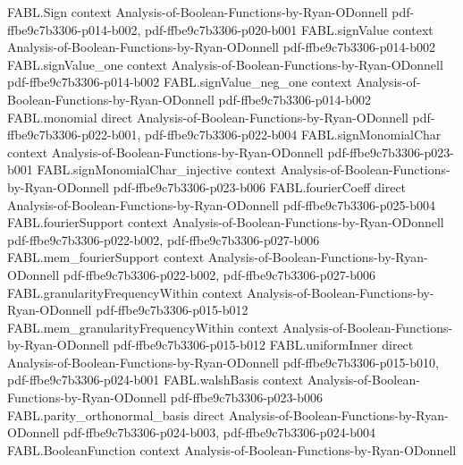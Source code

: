 \begin{theorem}
\label{FABL.parityFunction_toReal}
\leanok
{}
\proofstep
  {FABL.Sign}
  {context}
  {Analysis-of-Boolean-Functions-by-Ryan-ODonnell}
  {pdf-ffbe9c7b3306-p014-b002,
    pdf-ffbe9c7b3306-p020-b001}
\proofstep
  {FABL.signValue}
  {context}
  {Analysis-of-Boolean-Functions-by-Ryan-ODonnell}
  {pdf-ffbe9c7b3306-p014-b002}
\proofstep
  {FABL.signValue_one}
  {context}
  {Analysis-of-Boolean-Functions-by-Ryan-ODonnell}
  {pdf-ffbe9c7b3306-p014-b002}
\proofstep
  {FABL.signValue_neg_one}
  {context}
  {Analysis-of-Boolean-Functions-by-Ryan-ODonnell}
  {pdf-ffbe9c7b3306-p014-b002}
\proofstep
  {FABL.monomial}
  {direct}
  {Analysis-of-Boolean-Functions-by-Ryan-ODonnell}
  {pdf-ffbe9c7b3306-p022-b001,
    pdf-ffbe9c7b3306-p022-b004}
\proofstep
  {FABL.signMonomialChar}
  {context}
  {Analysis-of-Boolean-Functions-by-Ryan-ODonnell}
  {pdf-ffbe9c7b3306-p023-b001}
\proofstep
  {FABL.signMonomialChar_injective}
  {context}
  {Analysis-of-Boolean-Functions-by-Ryan-ODonnell}
  {pdf-ffbe9c7b3306-p023-b006}
\proofstep
  {FABL.fourierCoeff}
  {direct}
  {Analysis-of-Boolean-Functions-by-Ryan-ODonnell}
  {pdf-ffbe9c7b3306-p025-b004}
\proofstep
  {FABL.fourierSupport}
  {context}
  {Analysis-of-Boolean-Functions-by-Ryan-ODonnell}
  {pdf-ffbe9c7b3306-p022-b002,
    pdf-ffbe9c7b3306-p027-b006}
\proofstep
  {FABL.mem_fourierSupport}
  {context}
  {Analysis-of-Boolean-Functions-by-Ryan-ODonnell}
  {pdf-ffbe9c7b3306-p022-b002,
    pdf-ffbe9c7b3306-p027-b006}
\proofstep
  {FABL.granularityFrequencyWithin}
  {context}
  {Analysis-of-Boolean-Functions-by-Ryan-ODonnell}
  {pdf-ffbe9c7b3306-p015-b012}
\proofstep
  {FABL.mem_granularityFrequencyWithin}
  {context}
  {Analysis-of-Boolean-Functions-by-Ryan-ODonnell}
  {pdf-ffbe9c7b3306-p015-b012}
\proofstep
  {FABL.uniformInner}
  {direct}
  {Analysis-of-Boolean-Functions-by-Ryan-ODonnell}
  {pdf-ffbe9c7b3306-p015-b010,
    pdf-ffbe9c7b3306-p024-b001}
\proofstep
  {FABL.walshBasis}
  {context}
  {Analysis-of-Boolean-Functions-by-Ryan-ODonnell}
  {pdf-ffbe9c7b3306-p023-b006}
\proofstep
  {FABL.parity_orthonormal_basis}
  {direct}
  {Analysis-of-Boolean-Functions-by-Ryan-ODonnell}
  {pdf-ffbe9c7b3306-p024-b003,
    pdf-ffbe9c7b3306-p024-b004}
\proofstep
  {FABL.BooleanFunction}
  {context}
  {Analysis-of-Boolean-Functions-by-Ryan-ODonnell}

\end{theorem}
